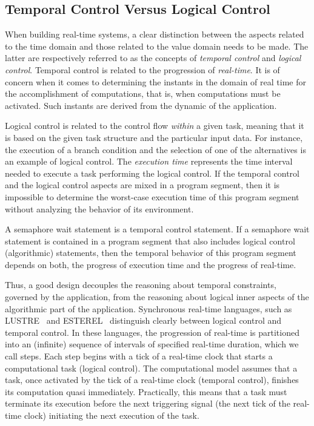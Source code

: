 \subsection{Temporal Control Versus Logical Control}
When building real-time systems, a clear distinction between the aspects related to the time 
domain and those related to the value domain needs to be made. The latter are respectively
referred to as the concepts of \emph{temporal control} and \emph{logical control}.
Temporal control is related to the progression of \emph{real-time}. It is of concern when it 
comes to determining the instants in the domain of real time for the accomplishment of 
computations, that is, when computations must be activated.
Such instants are derived from the dynamic of the application. 

Logical control is related to the control flow \emph{within} a given task, meaning that it 
is based on the given task structure and the particular input data. For instance, the execution
of a branch condition and the selection of one of the alternatives is an example of logical
control. The \emph{execution time} represents the time interval needed to execute a task
performing the logical control.
If the temporal control and the logical control aspects are mixed in a program segment,
then it is impossible to determine the worst-case execution time of this program segment without
analyzing the behavior of its environment.
\begin{example}\label{exp:control1}
 A semaphore wait statement is a temporal control statement. If a semaphore
wait statement is contained in a program segment that also includes logical control
(algorithmic) statements, then the temporal behavior of this program segment depends
on both, the progress of execution time and the progress of real-time.
\end{example}
Thus, a good design decouples the reasoning about temporal constraints, governed by the 
application, from the reasoning about logical inner aspects of the algorithmic part of the 
application.
Synchronous real-time languages, such as LUSTRE~\cite{intro:lustre} and 
ESTEREL~\cite{intro:esterel} distinguish clearly between logical control and temporal
control. In these languages, the progression of real-time is partitioned into an
(infinite) sequence of intervals of specified real-time duration, which we call
steps. Each step begins with a tick of a real-time clock that starts a computational
task (logical control). The computational model assumes that a task, once activated
by the tick of a real-time clock (temporal control), finishes its computation quasi
immediately. Practically, this means that a task must terminate its execution before
the next triggering signal (the next tick of the real-time clock) initiating the next
execution of the task.

